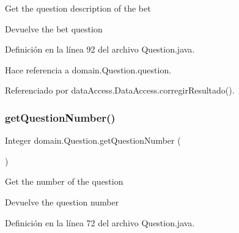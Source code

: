 Get the question description of the bet

\begin{DoxyReturn}{Devuelve}
the bet question 
\end{DoxyReturn}


Definición en la línea 92 del archivo Question.\+java.


\begin{DoxyCode}{0}

\end{DoxyCode}


Hace referencia a domain.\+Question.\+question.



Referenciado por data\+Access.\+Data\+Access.\+corregir\+Resultado().

\mbox{\label{classdomain_1_1Question_a5d70fcb8f2e33df7bf9f64114ec18d50}} 
\subsubsection{\texorpdfstring{getQuestionNumber()}{getQuestionNumber()}}
{\footnotesize\ttfamily Integer domain.\+Question.\+get\+Question\+Number (\begin{DoxyParamCaption}{ }\end{DoxyParamCaption})}

Get the number of the question

\begin{DoxyReturn}{Devuelve}
the question number 
\end{DoxyReturn}


Definición en la línea 72 del archivo Question.\+java.


\begin{DoxyCode}{0}

\end{DoxyCode}


